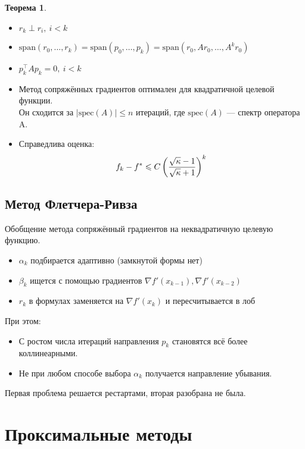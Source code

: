 \documentclass[11pt,a4paper]{report}
\def\le{\leqslant}
\theoremstyle{definition}
\theoremstyle{definition}
\newtheorem{theorem}{Теорема}[section]
\theoremstyle{definition}
\begin{document}
	\begin{theorem}$  $
		\begin{itemize}[$\diamond$]
			\item $ r_k \perp r_i,\ i < k $
			\item $ \mathrm{span} (r_0, \ldots, r_k) = \mathrm{span} (p_0, \ldots, p_k) = \mathrm{span} (r_0, Ar_0, \ldots, A^k r_0) $
			\item $ p_k^{\top} A p_k = 0,\ i < k $
			\item Метод сопряжённых градиентов оптимален для квадратичной целевой функции.\\ 
			Он сходится за $ |\mathrm{spec} (A)| \le n $ итераций, где $ \mathrm{spec}(A) $ — спектр оператора A.
			\item Справедлива оценка:
			$$
				f_k - f^{*} \le C \left ( \frac{\sqrt{\kappa} - 1}{\sqrt{\kappa} + 1} \right )^{k}\\
			$$
		\end{itemize}
	\end{theorem}
	\subsection{Метод Флетчера-Ривза}
	Обобщение метода сопряжённый градиентов на неквадратичную целевую функцию.
	\begin{itemize}[$\diamond$]
		\item $ \alpha_k $ подбирается адаптивно (замкнутой формы нет)
		\item $ \beta_k $ ищется с помощью градиентов $ \nabla f'(x_{k-1}), \nabla f'(x_{k-2}) $
		\item $ r_k $ в формулах заменяется на $ \nabla f'(x_k) $ и пересчитывается в лоб
	\end{itemize}
	При этом:
		\begin{itemize}[$\diamond$]
		\item С ростом числа итераций направления $ p_k $ становятся всё более коллинеарными.
		\item Не при любом способе выбора $ \alpha_k $ получается направление убывания.
	\end{itemize}
	Первая проблема решается рестартами, вторая разобрана не была.
	\section{Проксимальные методы}
\end{document}
